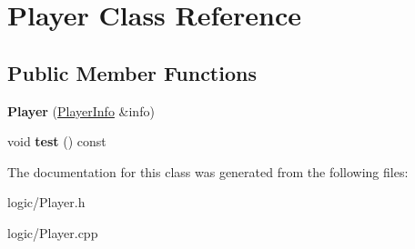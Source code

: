 \hypertarget{classPlayer}{}\section{Player Class Reference}
\label{classPlayer}
\subsection*{Public Member Functions}
\begin{DoxyCompactItemize}
\item 
\mbox{\label{classPlayer_a618464c7f53560e3abbfd7f259135221}} 
{\bfseries Player} (\hyperlink{classPlayerInfo}{Player\+Info} \&info)
\item 
\mbox{\label{classPlayer_a7d46e5528dc9afbe4c8b2c0823b95813}} 
void {\bfseries test} () const
\end{DoxyCompactItemize}


The documentation for this class was generated from the following files\+:\begin{DoxyCompactItemize}
\item 
logic/Player.\+h\item 
logic/Player.\+cpp\end{DoxyCompactItemize}
